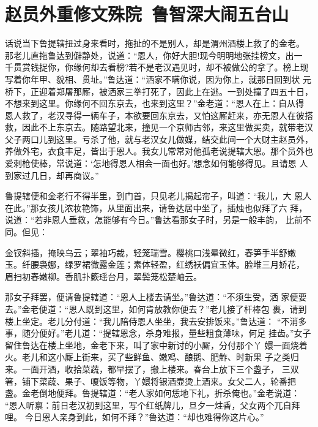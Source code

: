 \chapter{赵员外重修文殊院~鲁智深大闹五台山}

话说当下鲁提辖扭过身来看时，拖扯的不是别人，却是渭州酒楼上救了的金老。
那老儿直拖鲁达到僻静处，说道：“恩人，你好大胆!现今明明地张挂榜文，出一
千贯赏钱捉你，你缘何却去看榜?若不是老汉遇见时，却不被做公的拿了。榜上现
写着你年甲、貌相、贯址。”鲁达道：“洒家不瞒你说，因为你上，就那日回到状
元桥下，正迎着郑屠那厮，被洒家三拳打死了，因此上在逃。一到处撞了四五十日，
不想来到这里。你缘何不回东京去，也来到这里？”金老道：“恩人在上：自从得
恩人救了，老汉寻得一辆车子，本欲要回东京去，又怕这厮赶来，亦无恩人在彼搭
救，因此不上东京去。随路望北来，撞见一个京师古邻，来这里做买卖，就带老汉
父子两口儿到这里。亏杀了他，就与老汉女儿做媒，结交此间一个大财主赵员外，
养做外宅，衣食丰足，皆出于恩人。我女儿常常对他孤老说提辖大恩。那个员外也
爱刺枪使棒，常说道：‘怎地得恩人相会一面也好。’想念如何能够得见。且请恩
人到家过几日，却再商议。”

鲁提辖便和金老行不得半里，到门首，只见老儿揭起帘子，叫道：“我儿，大
恩人在此。”那女孩儿浓妆艳饰，从里面出来，请鲁达居中坐了，插烛也似拜了六
拜，说道：“若非恩人垂救，怎能够有今日。”鲁达看那女子时，另是一般丰韵，
比前不同。但见：

金钗斜插，掩映乌云；翠袖巧裁，轻笼瑞雪。樱桃口浅晕微红，春笋手半舒嫩
玉。纤腰袅娜，绿罗裙微露金莲；素体轻盈，红绣袄偏宜玉体。脸堆三月娇花，
眉扫初春嫩柳。香肌扑簌瑶台月，翠鬓笼松楚岫云。

那女子拜罢，便请鲁提辖道：“恩人上楼去请坐。”鲁达道：“不须生受，洒
家便要去。”金老便道：“恩人既到这里，如何肯放教你便去？”老儿接了杆棒包
裹，请到楼上坐定。老儿分付道：“我儿陪侍恩人坐坐，我去安排饭来。”鲁达道：
“不消多事，随分便好。”老儿道：“提辖恩念，杀身难报，量些粗食薄味，何足
挂齿。”女子留住鲁达在楼上坐地，金老下来，叫了家中新讨的小厮，分付那个丫
嬛一面烧着火。老儿和这小厮上街来，买了些鲜鱼、嫩鸡、酿鹅、肥鮓、时新果
子之类归来。一面开酒，收拾菜蔬，都早摆了，搬上楼来。春台上放下三个盏子，
三双箸，铺下菜蔬、果子、嗄饭等物，丫嬛将银酒壶烫上酒来。女父二人，轮番把
盏。金老倒地便拜。鲁提辖道：“老人家如何恁地下礼，折杀俺也。”金老说道：
“恩人听禀：前日老汉初到这里，写个红纸牌儿，旦夕一炷香，父女两个兀自拜哩。
今日恩人亲身到此，如何不拜？”鲁达道：“却也难得你这片心。”

